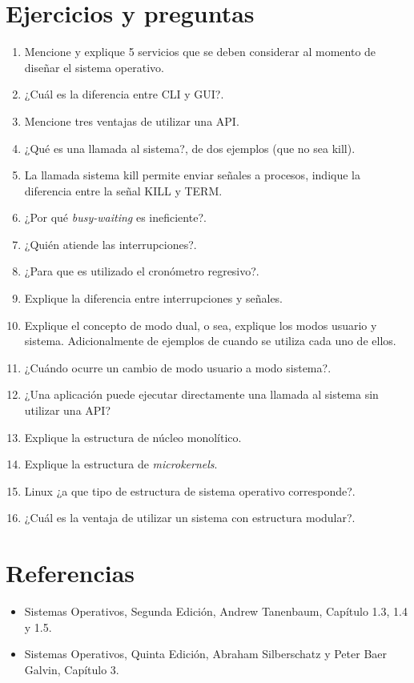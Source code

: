 \section{Ejercicios y preguntas}
\begin{enumerate}

	\item Mencione y explique 5 servicios que se deben considerar al momento
	de diseñar el sistema operativo.

	\item ¿Cuál es la diferencia entre CLI y GUI?.

	\item Mencione tres ventajas de utilizar una API.

	\item ¿Qué es una llamada al sistema?, de dos ejemplos (que no sea
	kill).

	\item La llamada sistema kill permite enviar señales a procesos, indique
	la diferencia entre la señal KILL y TERM.

	\item ¿Por qué \textit{busy-waiting} es ineficiente?.

	\item ¿Quién atiende las interrupciones?.

	\item ¿Para que es utilizado el cronómetro regresivo?.

	\item Explique la diferencia entre interrupciones y señales.

	\item Explique el concepto de modo dual, o sea, explique los modos
	usuario y sistema. Adicionalmente de ejemplos de cuando se utiliza cada
	uno de ellos.

	\item ¿Cuándo ocurre un cambio de modo usuario a modo sistema?.

	\item ¿Una aplicación puede ejecutar directamente una llamada al sistema
	sin utilizar una API?

	\item Explique la estructura de núcleo monolítico.

	\item Explique la estructura de \textit{microkernels}.

	\item Linux ¿a que tipo de estructura de sistema operativo corresponde?.

	\item ¿Cuál es la ventaja de utilizar un sistema con estructura
	modular?.

\end{enumerate}

\section{Referencias}
\begin{itemize}

	\item Sistemas Operativos, Segunda Edición, Andrew Tanenbaum, Capítulo
	1.3, 1.4 y 1.5.

	\item Sistemas Operativos, Quinta Edición, Abraham Silberschatz y Peter
	Baer Galvin, Capítulo 3.

\end{itemize}
